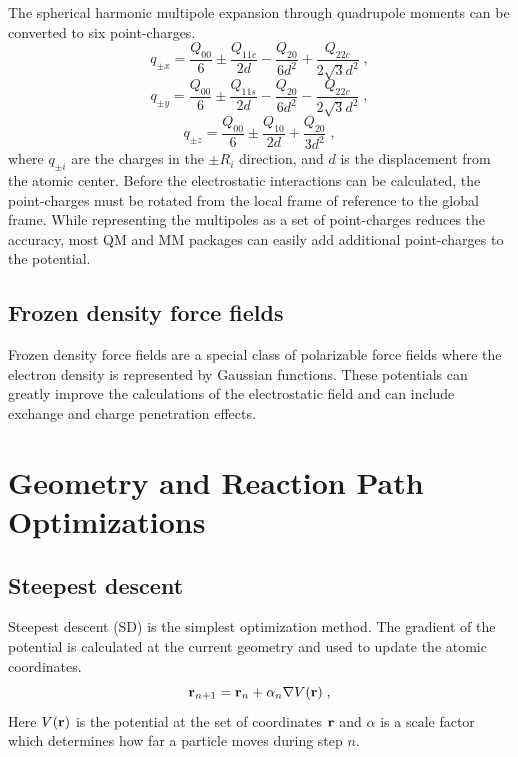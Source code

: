 \documentclass[12pt]{report}
\begin{document}
The spherical harmonic multipole expansion through quadrupole moments can be
converted to six point-charges. \cite{}
\begin{equation}
 q_{\pm x} = \frac{Q_{00}}{6} \pm \frac{Q_{11c}}{2d} -
          \frac{Q_{20}}{6d^2} + \frac{Q_{22c}}{2\sqrt{3}d^2} \; ,
\end{equation}
\begin{equation}
 q_{\pm y} = \frac{Q_{00}}{6} \pm \frac{Q_{11s}}{2d} -
          \frac{Q_{20}}{6d^2} - \frac{Q_{22c}}{2\sqrt{3}d^2} \; ,
\end{equation}
\begin{equation}
 q_{\pm z} = \frac{Q_{00}}{6} \pm \frac{Q_{10}}{2d} +
          \frac{Q_{20}}{3d^2} \; ,
\end{equation}
where $q_{\pm i}$ are the charges in the $\pm R_i$ direction, and $d$ is the
displacement from the atomic center. Before the electrostatic interactions can
be calculated, the point-charges must be rotated from the local frame of
reference to the global frame. While representing the multipoles as a set of
point-charges reduces the accuracy, most QM and MM packages can easily add
additional point-charges to the potential.

\subsection{Frozen density force fields}

Frozen density force fields are a special class of polarizable force fields
where the electron density is represented by Gaussian functions. These
potentials can greatly improve the calculations of the electrostatic field and
can include exchange and charge penetration effects.

\section{Geometry and Reaction Path Optimizations}

\subsection{Steepest descent}

Steepest descent (SD) is the simplest optimization method. The gradient of the
potential is calculated at the current geometry and used to update the atomic
coordinates.
\begin{equation}
 {\textbf r}_{n+1} = {\textbf r}_n+\alpha_n \nabla V({\textbf r}) \; ,
\end{equation}
Here $V({\textbf r})$ is the potential at the set of coordinates
${\textbf r}$ and $\alpha$ is a scale factor which determines how far a
particle moves during step $n$. \\
\end{document}
